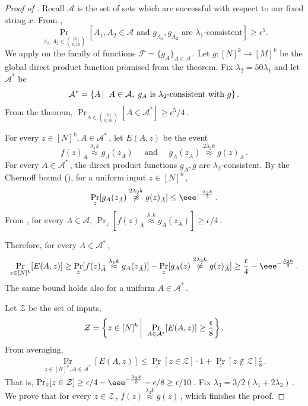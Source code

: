 \documentclass{toc}
\newcommand{\Paren}[1]{\left(#1\right)} %
\newcommand\sett[2]{\left\{ #1 \left| \; \vphantom{#1 #2} \right. #2  \right\}} %
\newcommand{\set}[1]{\{#1\}} %
\newcommand\f{f} %
\newcommand{\g}{g} %
\newcommand\neql[1]{\stackrel{{#1}}{ \approx}} %
\newcommand\neqg[1]{\stackrel{{#1}}{ \not\approx}} %
\newcommand\rest[1]{{\bar{#1}}}  %
\newcommand\zi{\mathcal{Z}} %
\begin{document}
\begin{proof}[Proof of ]
Recall $\mathcal{A}$ is the 
%
set %
of sets which are successful with respect to our fixed string $x$. From , \[\Pr_{A_1,A_2\in \binom{[k]}{k/10}}[A_1,A_2\in\mathcal{A} \textrm{ and }\g_{A_1},\g_{A_2} \text{ are } \lambda_1\textrm{-consistent}]\geq \epsilon^5.\]
We apply  on the family of functions $\mathcal{F} = \set{\g_A}_{A\in\mathcal{A}}$\,. Let $\g:[N]^k\rightarrow [M]^k$ be the global direct product function promised from the theorem. Fix $\lambda_2 = 50\lambda_1$ and let $\mathcal{A^*}$ be
 \[ \mathcal{A}^* = \sett{A}{A\in\mathcal{A},\;\g_A \text{ is } \lambda_2 \textrm{-consistent with }\g}.\]
From the theorem, $\Pr_{A\in\binom{[k]}{k/10}}[A\in\mathcal{A}^*]\geq 
%
\epsilon^5/4$\,. %

For every $z\in[N]^k,A\in\mathcal{A}^*$\,, let $E(A,z)$ be the event
\[ \f(z)_{\rest{A}}\neql{\lambda_1 k}\g_A(z_{\rest{A}}) \quad\textrm{ and }\quad \g_A(z_{\rest{A}})\neql{2\lambda_2 k}\g(z)_{\rest{A}}\,.\] %
For every $A\in\mathcal{A}^*$\,, the direct product functions $\g_A,\g$ are $\lambda_2$-consistent. By
the  %
Chernoff bound  %
(),   %
for a uniform input $z\in[N]^k$\,,
\[ \Pr_z[\g_A(z_{\rest{A}})\neqg{2\lambda_2 k}\g(z)_{\rest{A}}] \leq \eee^{-\frac{\lambda_2 k}{3}}\,. \]%
From , for every $A\in\mathcal{A}$, $\Pr_z[\f(z)_{\rest{A}}\neql{\lambda_1 k}\g_A(z_{\rest{A}})]\geq
%
\epsilon/4$\,.%

Therefore, for every $A\in\mathcal{A}^*$\,,
\[ \Pr_{z\in[N]^k}[E(A,z)]\geq \Pr_z[\f(z)_{\rest{A}}\neql{\lambda_1 k}\g_A(z_{\rest{A}})] - \Pr_z[\g_A(z)\neqg{2\lambda_2 k}\g(z)_{\rest{A}}] \geq \frac{\epsilon}{4}-\eee^{-\frac{\lambda_2 k}{3}}\,. \]%
The same bound holds also for a uniform $A\in\mathcal{A}^*$\,.


Let $\zi$ be the set of inputs,
\[ \zi = \sett{z\in[N]^k}{\Pr_{A\in\mathcal{A}^*}[E(A,z)]\geq \frac{\epsilon}{8}}.\]
From averaging,
\begin{align*}
   \Pr_{z\in[N]^k,A\in\mathcal{A}^*}[E(A,z)] \leq \Pr_z[z\in \zi]\cdot 1 + \Pr_z[z\notin \zi] \frac{\epsilon}{8}\,.%
\end{align*}
That is, 
%
$\Pr_z[z\in \zi] \geq \epsilon/4- \eee^{-\frac{\lambda_2 k}{3}} - \epsilon/8 \geq \epsilon/10$\,. %
Fix 
%
$\lambda_3 = 3/2\Paren{\lambda_1+2\lambda_2}\,.$ %
We prove that for every $z\in\zi$\,, $\f(z)\neql{\lambda_3 k}\g(z)$\,, which finishes the proof.


\end{proof}
\end{document}
